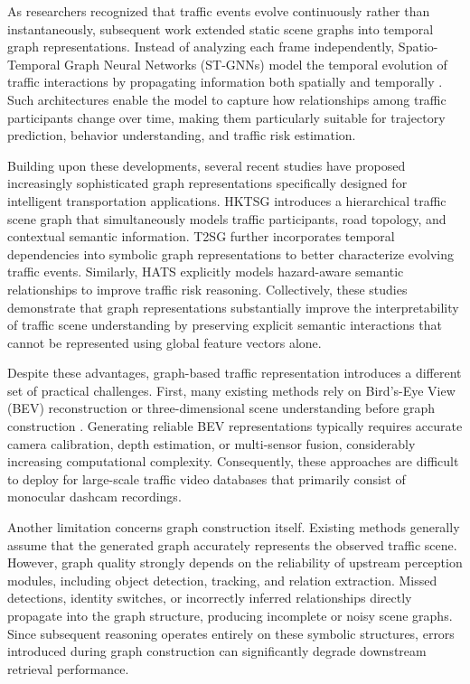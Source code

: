 \documentclass[a4paper, 11pt]{article} %
\begin{document}
As researchers recognized that traffic events evolve continuously rather than instantaneously, subsequent work extended static scene graphs into temporal graph representations. Instead of analyzing each frame independently, Spatio-Temporal Graph Neural Networks (ST-GNNs) model the temporal evolution of traffic interactions by propagating information both spatially and temporally \cite{bao2020uncertainty}. Such architectures enable the model to capture how relationships among traffic participants change over time, making them particularly suitable for trajectory prediction, behavior understanding, and traffic risk estimation.

Building upon these developments, several recent studies have proposed increasingly sophisticated graph representations specifically designed for intelligent transportation applications. HKTSG \cite{zhou2024hktsg} introduces a hierarchical traffic scene graph that simultaneously models traffic participants, road topology, and contextual semantic information. T2SG \cite{lv2024t2sg} further incorporates temporal dependencies into symbolic graph representations to better characterize evolving traffic events. Similarly, HATS \cite{huang2024hazard} explicitly models hazard-aware semantic relationships to improve traffic risk reasoning. Collectively, these studies demonstrate that graph representations substantially improve the interpretability of traffic scene understanding by preserving explicit semantic interactions that cannot be represented using global feature vectors alone.

Despite these advantages, graph-based traffic representation introduces a different set of practical challenges. First, many existing methods rely on Bird's-Eye View (BEV) reconstruction or three-dimensional scene understanding before graph construction \cite{zhou2024hktsg,lv2024t2sg}. Generating reliable BEV representations typically requires accurate camera calibration, depth estimation, or multi-sensor fusion, considerably increasing computational complexity. Consequently, these approaches are difficult to deploy for large-scale traffic video databases that primarily consist of monocular dashcam recordings.

Another limitation concerns graph construction itself. Existing methods generally assume that the generated graph accurately represents the observed traffic scene. However, graph quality strongly depends on the reliability of upstream perception modules, including object detection, tracking, and relation extraction. Missed detections, identity switches, or incorrectly inferred relationships directly propagate into the graph structure, producing incomplete or noisy scene graphs. Since subsequent reasoning operates entirely on these symbolic structures, errors introduced during graph construction can significantly degrade downstream retrieval performance.
\end{document}
